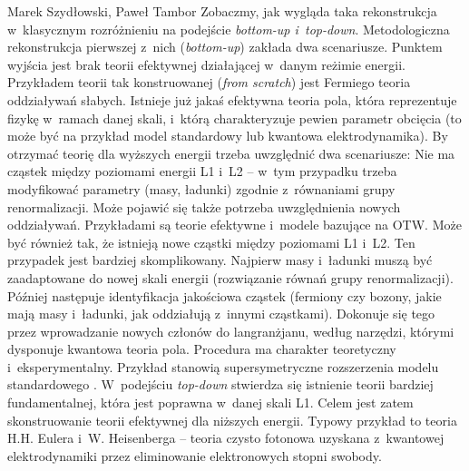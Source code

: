 \begin{artplenv2auth}{Marek Szydłowski, Paweł Tambor}
Zobaczmy, jak wygląda taka rekonstrukcja w~klasycznym rozróżnieniu na podejście \textit{bottom-up i~top-down}. Metodologiczna rekonstrukcja pierwszej z~nich (\textit{bottom-up}) zakłada dwa scenariusze. Punktem wyjścia jest brak teorii efektywnej działającej w~danym reżimie energii. Przykładem teorii tak konstruowanej (\textit{from scratch}) jest Fermiego teoria oddziaływań słabych. Istnieje już jakaś efektywna teoria pola, która reprezentuje fizykę w~ramach danej skali, i~którą charakteryzuje pewien parametr obcięcia (to może być na przykład model standardowy lub kwantowa elektrodynamika). By otrzymać teorię dla wyższych energii trzeba uwzględnić dwa scenariusze: Nie ma cząstek między poziomami energii L1 i~L2 -- w~tym przypadku trzeba modyfikować parametry (masy, ładunki) zgodnie z~równaniami grupy renormalizacji. Może pojawić się także potrzeba uwzględnienia nowych oddziaływań. Przykładami są teorie efektywne i~modele bazujące na OTW. Może być również tak, że istnieją nowe cząstki między poziomami L1 i~L2. Ten przypadek jest bardziej skomplikowany. Najpierw masy i~ładunki muszą być zaadaptowane do nowej skali energii (rozwiązanie równań grupy renormalizacji). Później następuje identyfikacja jakościowa cząstek (fermiony czy bozony, jakie mają masy i~ładunki, jak oddziałują z~innymi cząstkami). Dokonuje się tego przez wprowadzanie nowych członów do langranżjanu, według narzędzi, którymi dysponuje kwantowa teoria pola. Procedura ma charakter teoretyczny i~eksperymentalny. Przykład stanowią supersymetryczne rozszerzenia modelu standardowego
\parencites[][]{cao_conceptual_1993}[por.][]{cao_why_1999}[][]{arnold_metody_1981}[][]{kane_supersymetria_2006}. %
 W~podejściu \textit{top-down} stwierdza się istnienie teorii bardziej fundamentalnej, która jest poprawna w~danej skali L1. Celem jest zatem skonstruowanie teorii efektywnej dla niższych energii. Typowy przykład to teoria H.H. Eulera i~W. Heisenberga -- teoria czysto fotonowa uzyskana z~kwantowej elektrodynamiki przez eliminowanie elektronowych stopni swobody.


\end{artplenv2auth}
